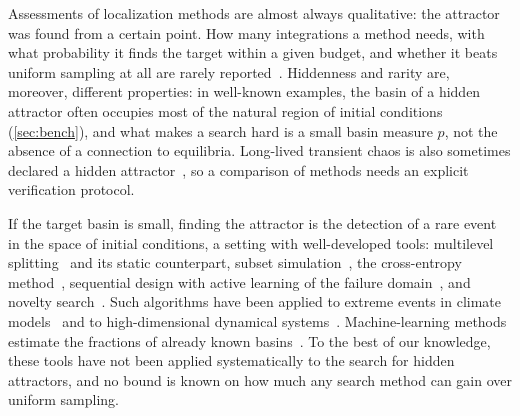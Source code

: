 Assessments of localization methods are almost always qualitative: the attractor was found from a certain point. How many integrations a method needs, with what probability it finds the target within a given budget, and whether it beats uniform sampling at all are rarely reported~\cite{GuanXie2025,Zelinka2016}. Hiddenness and rarity are, moreover, different properties: in well-known examples, the basin of a hidden attractor often occupies most of the natural region of initial conditions (\cref{sec:bench}), and what makes a search hard is a small basin measure $p$, not the absence of a connection to equilibria. Long-lived transient chaos is also sometimes declared a hidden attractor~\cite{Munmuangsaen2018,SprottMunmuangsaen2018Comment,Danca2016Transient,YorkeYorke1979,GrebogiOttYorke1983,LaiTel2011}, so a comparison of methods needs an explicit verification protocol.

If the target basin is small, finding the attractor is the detection of a rare event in the space of initial conditions, a setting with well-developed tools: multilevel splitting~\cite{Glasserman1999,CerouGuyader2007,Cerou2019AMS} and its static counterpart, subset simulation~\cite{AuBeck2001}, the cross-entropy method~\cite{Rubinstein1999CE}, sequential design with active learning of the failure domain~\cite{Bect2012,Echard2011AKMCS}, and novelty search~\cite{LehmanStanley2011,MouretClune2015,Pugh2016QD,CullyDemiris2018}. Such algorithms have been applied to extreme events in climate models~\cite{Ragone2018,Lestang2018TAMS} and to high-dimensional dynamical systems~\cite{Baars2021AMS}. Machine-learning methods estimate the fractions of already known basins~\cite{Wang2022HAL,Cao2025AL,Yang2024PRR,DNNBasins2021,Gameiro2025,Haerter2026BBT}. To the best of our knowledge, these tools have not been applied systematically to the search for hidden attractors, and no bound is known on how much any search method can gain over uniform sampling.

